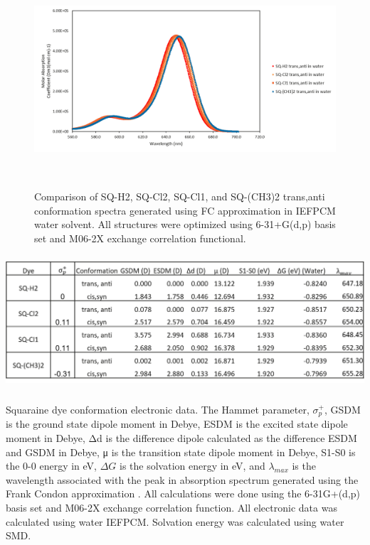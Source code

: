 \documentclass[journal=jacsat,manuscript=article]{achemso}
\begin{document}
\begin{figure}[h]
    \centering
    \includegraphics[width=15cm,height=8cm]{figures/sq1_4_8_14.png}
    \caption{Comparison of  SQ-H2, SQ-Cl2, SQ-Cl1, and SQ-(CH3)2 trans,anti conformation spectra generated using FC approximation in IEFPCM water solvent. All structures were optimized  using 6-31+G(d,p) basis set and M06-2X exchange correlation functional.}
    \label{tab:SQ1,4,8,14 absorption}
\end{figure}


\begin{table}[h]
    \centering
    \includegraphics[width=17cm,height=5cm]{figures/sq1_4_8_14-table.png}
    \caption{Squaraine dye conformation electronic data. The Hammet parameter, $\sigma_{p}^{+}$\cite{Hansch1991AParameters}, GSDM is the ground state dipole moment in Debye, ESDM is the excited state dipole moment in Debye, Δd is the difference dipole calculated as the difference ESDM and GSDM in Debye, μ is the transition state dipole moment in Debye, S1-S0 is the 0-0 energy in eV, $\Delta G$ is the solvation energy in eV, and $\lambda_{max}$ is the wavelength associated with the peak in absorption spectrum generated using the Frank Condon approximation . All calculations were done using the 6-31G+(d,p) basis set and M06-2X exchange correlation function. All electronic data was calculated using water IEFPCM. Solvation energy was calculated using water SMD.}
    \label{tab:SQ1,4,8,14 lambda data}
\end{table}
\end{document}
